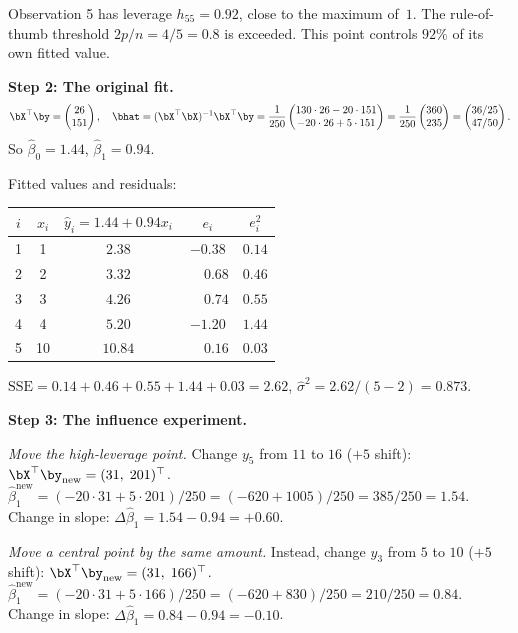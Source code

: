 \begin{example}
Observation 5 has leverage $h_{55} = 0.92$, close to the maximum of~$1$.
The rule-of-thumb threshold $2p/n = 4/5 = 0.8$ is exceeded.
This point controls $92\%$ of its own fitted value.

\medskip\noindent\textbf{Step 2: The original fit.}
\[
\bX^\top\by = \begin{pmatrix}26\\151\end{pmatrix},\quad
\bhat = (\bX^\top\bX)^{-1}\bX^\top\by
= \frac{1}{250}\begin{pmatrix}130\cdot26 - 20\cdot151\\-20\cdot26+5\cdot151\end{pmatrix}
= \frac{1}{250}\begin{pmatrix}360\\235\end{pmatrix}
= \begin{pmatrix}36/25\\47/50\end{pmatrix}.
\]
So $\hat\beta_0 = 1.44$, $\hat\beta_1 = 0.94$.

Fitted values and residuals:
\begin{center}
\renewcommand{\arraystretch}{1.2}
\begin{tabular}{c|cccc}
\toprule
$i$ & $x_i$ & $\hat{y}_i = 1.44+0.94x_i$ & $e_i$ & $e_i^2$ \\
\midrule
1 & 1 & $2.38$ & $-0.38$ & $0.14$ \\
2 & 2 & $3.32$ & $\phantom{-}0.68$ & $0.46$ \\
3 & 3 & $4.26$ & $\phantom{-}0.74$ & $0.55$ \\
4 & 4 & $5.20$ & $-1.20$ & $1.44$ \\
5 & 10 & $10.84$ & $\phantom{-}0.16$ & $0.03$ \\
\bottomrule
\end{tabular}
\end{center}
$\text{SSE} = 0.14+0.46+0.55+1.44+0.03 = 2.62$, $\hat\sigma^2 = 2.62/(5-2) = 0.873$.

\medskip\noindent\textbf{Step 3: The influence experiment.}

\emph{Move the high-leverage point.}
Change $y_5$ from $11$ to $16$ ($+5$ shift):
$\bX^\top\by_{\text{new}} = (31,\;201)^\top$.
$\hat\beta_1^{\text{new}} = (-20\cdot31+5\cdot201)/250 = (-620+1005)/250 = 385/250 = 1.54$.
Change in slope: $\Delta\hat\beta_1 = 1.54-0.94 = +0.60$.

\emph{Move a central point by the same amount.}
Instead, change $y_3$ from $5$ to $10$ ($+5$ shift):
$\bX^\top\by_{\text{new}} = (31,\;166)^\top$.
$\hat\beta_1^{\text{new}} = (-20\cdot31+5\cdot166)/250 = (-620+830)/250 = 210/250 = 0.84$.
Change in slope: $\Delta\hat\beta_1 = 0.84-0.94 = -0.10$.


\end{example}
